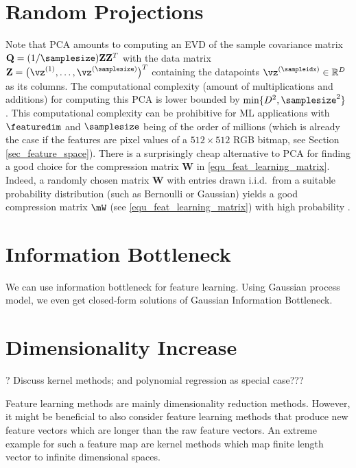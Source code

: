 \documentclass[12pt]{report}
\begin{document}
\section{Random Projections} 
Note that PCA amounts to computing an EVD of the sample covariance matrix 
$\mathbf{Q} = (1/\samplesize) \mathbf{Z} \mathbf{Z}^{T}$ with the data matrix 
$\mathbf{Z} = \big(\vz^{(1)},\ldots,\vz^{(\samplesize)}\big)^{T}$ containing the 
datapoints $\vz^{(\sampleidx)} \in \mathbb{R}^{D}$ as its columns. The computational 
complexity (amount of multiplications and additions) for computing this PCA is lower 
bounded by $\min\{ D^{2}, \samplesize^{2} \}$ \cite{Du08low-complexityprincipal,Sharma2007}. 
This computational complexity can be prohibitive for ML applications with $\featuredim$ 
and $\samplesize$ being of the order of millions (which is already the case if the features 
are pixel values of a $512 \times 512$ RGB bitmap, see Section \ref{sec_feature_space}). 
There is a surprisingly cheap alternative to PCA for finding a good choice for the 
compression matrix $\mathbf{W}$ in \eqref{equ_feat_learning_matrix}. Indeed, a randomly 
chosen matrix $\mathbf{W}$ with entries drawn i.i.d.\ from a suitable probability distribution 
(such as Bernoulli or Gaussian) yields a good compression matrix $\mW$ (see \eqref{equ_feat_learning_matrix}) 
with high probability \cite{Bingham01randomprojection,jung-specesttit}. 


\section{Information Bottleneck}
We can use information bottleneck for feature learning. Using Gaussian process model, we even 
get closed-form solutions of Gaussian Information Bottleneck. 


\section{Dimensionality Increase} 
\label{sec_dim_increas} 

? Discuss kernel methods; and polynomial regression as special case???

Feature learning methods are mainly dimensionality reduction methods.
However, it might be beneficial to also consider feature learning methods 
that produce new feature vectors which are longer than the raw feature 
vectors. An extreme example for such a feature map are kernel 
methods which map finite length vector to infinite dimensional spaces. 
\end{document}
